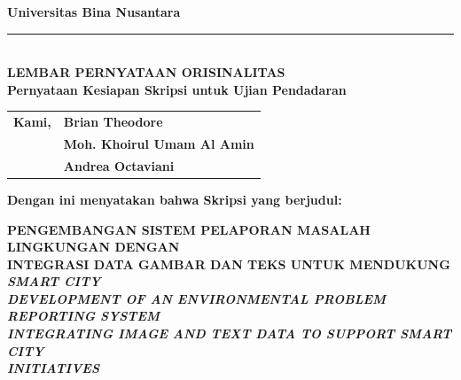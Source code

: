 
\clearpage
\thispagestyle{plain}
{}

\begingroup
{}\selectfont %

\vspace*{-2cm} %

\begin{center}
    \textbf{\large Universitas Bina Nusantara}\\[0.1cm] 
    \rule{\textwidth}{1pt}\\[0.1cm] 
    \textbf{\large LEMBAR PERNYATAAN ORISINALITAS}\\[0.1cm]
    \textbf{Pernyataan Kesiapan Skripsi untuk Ujian Pendadaran}
\end{center}

\vfill %

\noindent
\begin{tabular}{@{}ll}
    \textbf{Kami,} & \textbf{Brian Theodore} \\
                   & \textbf{Moh. Khoirul Umam Al Amin} \\
                   & \textbf{Andrea Octaviani}
\end{tabular}

\vspace{0.5em}

\noindent\textbf{Dengan ini menyatakan bahwa Skripsi yang berjudul:}

\vfill %

\begin{center}
    \textbf{PENGEMBANGAN SISTEM PELAPORAN MASALAH LINGKUNGAN DENGAN}\\
    \textbf{INTEGRASI DATA GAMBAR DAN TEKS UNTUK MENDUKUNG \textit{SMART CITY}}\\[0.5em]
    
    \textit{\textbf{DEVELOPMENT OF AN ENVIRONMENTAL PROBLEM REPORTING SYSTEM}}\\
    \textit{\textbf{INTEGRATING IMAGE AND TEXT DATA TO SUPPORT SMART CITY}}\\
    \textit{\textbf{INITIATIVES}}
\end{center}

